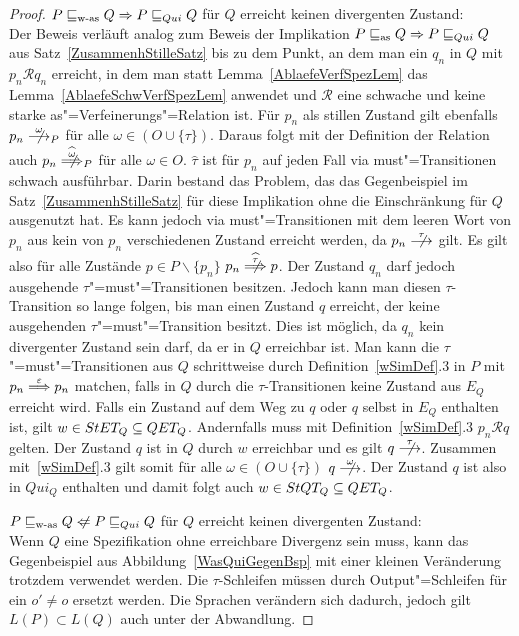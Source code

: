 \begin{proof}
  $P \sqsubseteq _{\mathrm{w}\text{-}\mathrm{as}} Q \Rightarrow P  \sqsubseteq  _{Qui} Q$ für $Q$ erreicht keinen divergenten
  Zustand:\\
  Der Beweis verläuft analog zum Beweis der Implikation $P \sqsubseteq _{\mathrm{as}} Q \Rightarrow
  P  \sqsubseteq  _{Qui} Q$ aus Satz~\ref{ZusammenhStilleSatz} bis zu dem Punkt, an dem man
  ein $q_n$ in $Q$ mit $p_n \mathcal{R} q_n$ erreicht, in dem man statt
  Lemma~\ref{AblaefeVerfSpezLem} das Lemma~\ref{AblaefeSchwVerfSpezLem}
  anwendet und $\mathcal{R}$ eine schwache und keine starke
  as"=Verfeinerungs"=Relation ist. Für $p_n$ als stillen Zustand gilt ebenfalls
  $p_n \nmust[\omega]_P$ für alle $\omega\in (O\cup\{\tau\})$. Daraus folgt mit
  der Definition der Relation \weakmust{} auch $p_n
  \nweakmust[\widehat{\omega}]_P$ für alle $\omega\in O$. $\widehat{\tau}$ ist
  für $p_n$ auf jeden Fall via \glqq must"=Transitionen\grqq{} schwach
  ausführbar. Darin bestand das Problem, das das Gegenbeispiel im
  Satz~\ref{ZusammenhStilleSatz} für diese Implikation ohne die Einschränkung
  für $Q$ ausgenutzt hat. Es kann jedoch via must"=Transitionen mit dem leeren
  Wort von $p_n$ aus kein von $p_n$ verschiedenen Zustand erreicht werden, da
  $p_n \nmust[\tau]$ gilt. Es gilt also für alle Zustände $p\in P\backslash
  \{p_n\}$ $p_n \nweakmust[\widehat{\tau}] p$. Der Zustand $q_n$ darf jedoch
  ausgehende $\tau$"=must"=Transitionen besitzen. Jedoch kann man diesen
  $\tau$-Transition so lange folgen, bis man einen Zustand $q$ erreicht, der
  keine ausgehenden $\tau$"=must"=Transition besitzt. Dies ist möglich, da
  $q_n$ kein divergenter Zustand sein darf, da er in $Q$ erreichbar ist. Man
  kann die $\tau$"=must"=Transitionen aus $Q$ schrittweise durch
  Definition~\ref{wSimDef}.3 in $P$ mit $p_n \weakmust[\varepsilon] p_n$
  matchen, falls in $Q$ durch die $\tau$-Transitionen keine Zustand aus $E_Q$
  erreicht wird. Falls ein Zustand auf dem Weg zu $q$ oder $q$ selbst in $E_Q$
  enthalten ist, gilt $w\in StET _Q \subseteq QET _Q$. Andernfalls muss mit
  Definition~\ref{wSimDef}.3 $p_n\mathcal{R} q$ gelten. Der Zustand $q$ ist in
  $Q$ durch $w$ erreichbar und es gilt $q \nmust[\tau]$. Zusammen
  mit~\ref{wSimDef}.3 gilt somit für alle $\omega \in (O\cup \{\tau\})$ $q
  \nmust[\omega]$. Der Zustand $q$ ist also in $Qui_Q$ enthalten und damit
  folgt auch $w \in StQT _Q\subseteq QET _Q$.

  $P \wasRel Q \hspace{0.1cm}\not\hspace{-0.1cm}\Leftarrow P \QRel Q$ für $Q$
  erreicht keinen divergenten Zustand:\\
  Wenn $Q$ eine Spezifikation ohne erreichbare Divergenz sein muss, kann das
  Gegenbeispiel aus Abbildung~\ref{WasQuiGegenBsp} mit einer kleinen
  Veränderung trotzdem verwendet werden. Die $\tau$-Schleifen müssen durch
  Output"=Schleifen für ein $o'\neq o$ ersetzt werden. Die Sprachen verändern
  sich dadurch, jedoch gilt $L(P) \subset L(Q)$ auch unter der Abwandlung.
\end{proof}

